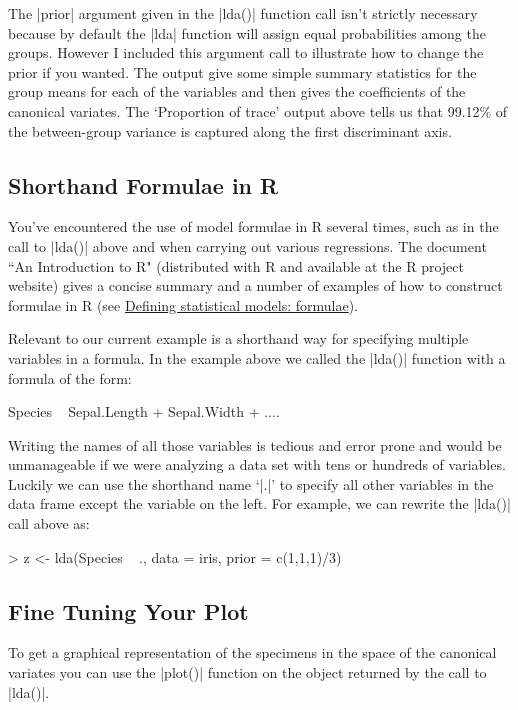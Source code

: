 The |prior| argument given in the |lda()| function call isn't strictly necessary because by default the |lda| function will assign equal probabilities among the groups. However I included this argument call to illustrate how to change the prior if you wanted. The output give some simple summary statistics for the group means for each of the variables and then gives the coefficients of the canonical variates.  The `Proportion of trace' output above tells us that 99.12\% of the between-group variance is captured along the first discriminant axis.

\subsection{Shorthand Formulae in R}

You've encountered the use of model formulae in R several times, such as in the call to |lda()| above and when carrying out various regressions.  The document ``An Introduction to R" (distributed with R and available at the R project website) gives a concise summary and a number of examples of how to construct formulae in R (see \href{http://cran.r-project.org/doc/manuals/R-intro.html#Formulae-for-statistical-models}{Defining statistical models: formulae}).

Relevant to our current example is a shorthand way for specifying multiple variables in a formula. In the example above we called the |lda()| function with a formula of the form: 
\begin{R}
Species ~ Sepal.Length + Sepal.Width + ....
\end{R}

Writing the names of all those variables is tedious and error prone and would be unmanageable if we were analyzing a data set with tens or hundreds of variables. Luckily we can use the shorthand name `|.|' to specify all other variables in the data frame except the variable on the left.  For example, we can rewrite the |lda()| call above as:

\begin{R}
> z <- lda(Species ~ ., data = iris, prior = c(1,1,1)/3)
\end{R}

\subsection{Fine Tuning Your Plot}

To get a graphical representation of the specimens in the space of the canonical variates you can use the |plot()| function on the object returned by the call to |lda()|.

